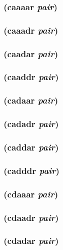 \documentclass{article}
\begin{document}
\subsubsection{(caaaar \emph{pair})}

\subsubsection{(caaadr \emph{pair})}

\subsubsection{(caadar \emph{pair})}

\subsubsection{(caaddr \emph{pair})}

\subsubsection{(cadaar \emph{pair})}

\subsubsection{(cadadr \emph{pair})}

\subsubsection{(caddar \emph{pair})}

\subsubsection{(cadddr \emph{pair})}

\subsubsection{(cdaaar \emph{pair})}

\subsubsection{(cdaadr \emph{pair})}

\subsubsection{(cdadar \emph{pair})}
\end{document}
